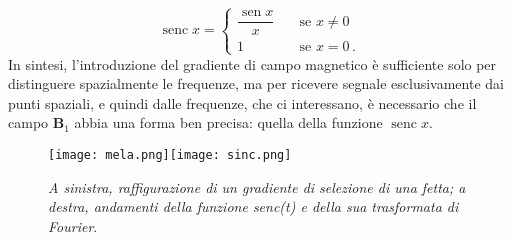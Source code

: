 \documentclass{report}
\numberwithin{equation}{section}
\numberwithin{figure}{section}
\DeclareMathOperator{\sen}{sen}
\DeclareMathOperator{\senc}{senc}
\renewcommand{\Vec}{\bm}
\begin{document}
\[ \senc{x} =
   \begin{cases}
    \dfrac{\sen{x}}{x} & \quad \text{se } x\neq0 \\
    1                          & \quad \text{se } x=0 \,.
   \end{cases}
\]
In sintesi, l'introduzione del gradiente di campo magnetico è sufficiente solo per distinguere spazialmente le frequenze, ma per ricevere segnale esclusivamente dai punti spaziali, e quindi dalle frequenze, che ci interessano, è necessario che il campo $\Vec{B}_1$ abbia una forma ben precisa: quella della funzione $\senc{x}$.

\begin{figure}[htp]
\centering
\texttt{[image: mela.png]}\quad\texttt{[image: sinc.png]}
\caption{\label{fig:mela} \textit{A sinistra, raffigurazione di un gradiente di selezione di una fetta; a destra, andamenti della funzione \textnormal{senc}(t) e della sua trasformata di Fourier}.}
\end{figure}
\end{document}
